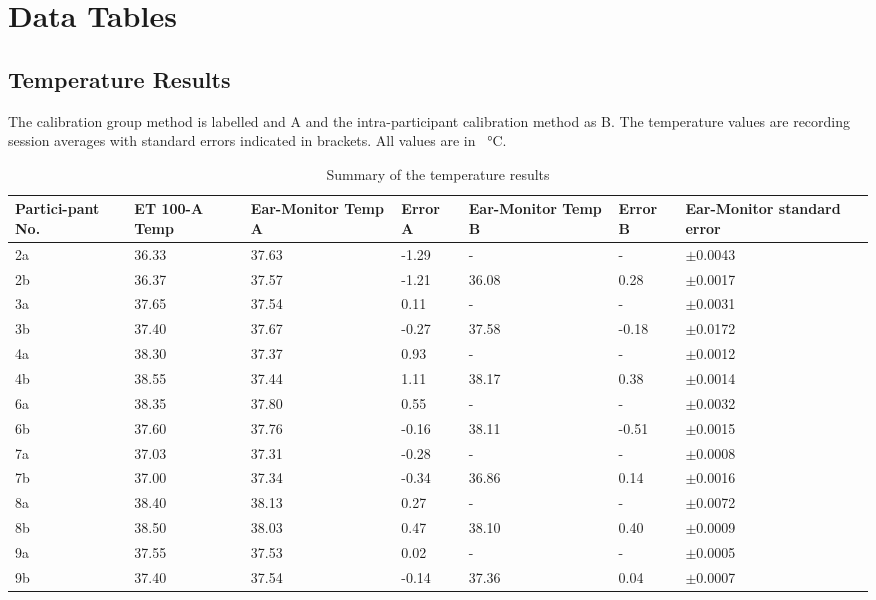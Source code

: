 \chapter{Data Tables}
\label{Data Tables}

\section{Temperature Results}
\label{sec:Temperature Results}

The calibration group method is labelled and A and the intra-participant calibration method as B. The temperature values are recording session averages with standard errors indicated in brackets. All values are in \SI{}{\celsius}.

\begin{longtable}{|P{1.4cm} | P{1.4cm} || P{1.6cm} |P{1.2cm}| |P{1.6cm} |P{1.2cm}||P{2cm}|} 
\caption{Summary of the temperature results} \label{tab:ResultsTemp}\\
\hline
Partici-pant No.	&	ET 100-A Temp	&	Ear-Monitor Temp A	&	Error A	&	Ear-Monitor Temp B	&	Error B	&	Ear-Monitor standard error\\
\hline
2a	&	36.33	&	37.63 	&	-1.29	&	-		&	-		&	$\pm$0.0043\\
2b	&	36.37	&	37.57 	&	-1.21	&	36.08	&	0.28	&	$\pm$0.0017\\
3a	&	37.65	&	37.54 	&	0.11	&	-		&	-		&	$\pm$0.0031\\
3b	&	37.40	&	37.67 	&	-0.27	&	37.58	&	-0.18	&	$\pm$0.0172\\
4a	&	38.30	&	37.37 	&	0.93	&	-		&	-		&	$\pm$0.0012\\
4b	&	38.55	&	37.44 	&	1.11	&	38.17	&	0.38	&	$\pm$0.0014\\
6a	&	38.35	&	37.80 	&	0.55	&	-		&	-		&	$\pm$0.0032\\
6b	&	37.60	&	37.76 	&	-0.16	&	38.11	&	-0.51	&	$\pm$0.0015\\
7a	&	37.03	&	37.31 	&	-0.28	&	-		&	-		&	$\pm$0.0008\\
7b	&	37.00	&	37.34 	&	-0.34	&	36.86	&	0.14	&	$\pm$0.0016\\
8a	&	38.40	&	38.13 	&	0.27	&	-		&	-		&	$\pm$0.0072\\
8b	&	38.50	&	38.03 	&	0.47	&	38.10	&	0.40	&	$\pm$0.0009\\
9a	&	37.55	&	37.53 	&	0.02	&	-		&	-		&	$\pm$0.0005\\
9b	&	37.40	&	37.54 	&	-0.14	&	37.36	&	0.04	&	$\pm$0.0007\\

\end{longtable}
